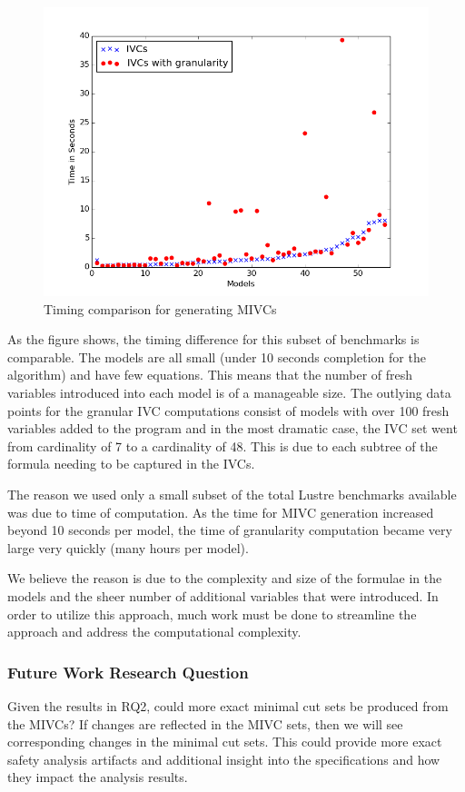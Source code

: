 \begin{figure}[h!]
\begin{center}
\includegraphics[width=.8\textwidth]{images/granularityIVC.png}
\caption{Timing comparison for generating MIVCs} 
\label{fig:granIVC}
\end{center}
\end{figure}

As the figure shows, the timing difference for this subset of benchmarks is comparable. The models are all small (under 10 seconds completion for the \aivcalg algorithm) and have few equations. This means that the number of fresh variables introduced into each model is of a manageable size. The outlying data points for the granular IVC computations consist of models with over 100 fresh variables added to the program and in the most dramatic case, the IVC set went from cardinality of 7 to a cardinality of 48. This is due to each subtree of the formula needing to be captured in the IVCs. 

The reason we used only a small subset of the total Lustre benchmarks available was due to time of computation. As the time for MIVC generation increased beyond 10 seconds per model, the time of granularity computation became very large very quickly (many hours per model). 

We believe the reason is due to the complexity and size of the formulae in the models and the sheer number of additional variables that were introduced. In order to utilize this approach, much work must be done to streamline the approach and address the computational complexity. 

\subsubsection{Future Work Research Question}
Given the results in RQ2, could more exact minimal cut sets be produced from the MIVCs? If changes are reflected in the MIVC sets, then we will see corresponding changes in the minimal cut sets. This could provide more exact safety analysis artifacts and additional insight into the specifications and how they impact the analysis results.

